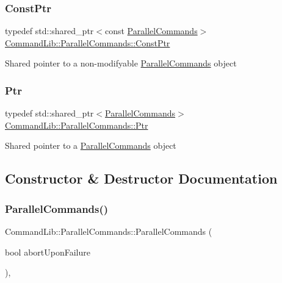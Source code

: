 \subsubsection{\texorpdfstring{Const\+Ptr}{ConstPtr}}
{\footnotesize\ttfamily typedef std\+::shared\+\_\+ptr$<$const \mbox{\hyperlink{class_command_lib_1_1_parallel_commands}{Parallel\+Commands}}$>$ \mbox{\hyperlink{class_command_lib_1_1_parallel_commands_a8ad2164f54391fa1cdffb5d44298580e}{Command\+Lib\+::\+Parallel\+Commands\+::\+Const\+Ptr}}}



Shared pointer to a non-\/modifyable \mbox{\hyperlink{class_command_lib_1_1_parallel_commands}{Parallel\+Commands}} object

\mbox{\label{class_command_lib_1_1_parallel_commands_affafd160eae15443666daaf2608fd441}} 
\subsubsection{\texorpdfstring{Ptr}{Ptr}}
{\footnotesize\ttfamily typedef std\+::shared\+\_\+ptr$<$\mbox{\hyperlink{class_command_lib_1_1_parallel_commands}{Parallel\+Commands}}$>$ \mbox{\hyperlink{class_command_lib_1_1_parallel_commands_affafd160eae15443666daaf2608fd441}{Command\+Lib\+::\+Parallel\+Commands\+::\+Ptr}}}



Shared pointer to a \mbox{\hyperlink{class_command_lib_1_1_parallel_commands}{Parallel\+Commands}} object



\subsection{Constructor \& Destructor Documentation}
\mbox{\label{class_command_lib_1_1_parallel_commands_a795b2df9523b7a154261a52971b29bef}} 
\subsubsection{\texorpdfstring{Parallel\+Commands()}{ParallelCommands()}}
{\footnotesize\ttfamily Command\+Lib\+::\+Parallel\+Commands\+::\+Parallel\+Commands (\begin{DoxyParamCaption}\item[{bool}]{abort\+Upon\+Failure }\end{DoxyParamCaption})\hspace{0.3cm}{\ttfamily [explicit]}, {\ttfamily [protected]}}



